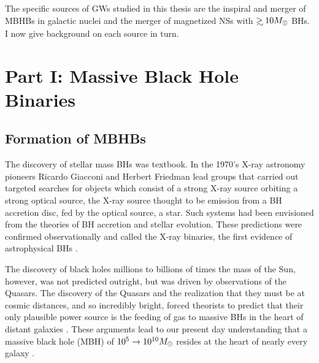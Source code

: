 The specific sources of GWs studied in this thesis are the inspiral and merger
of MBHBs in galactic nuclei and the merger of magnetized NSs with $\gsim 10
\Msun$ BHs. I now give background on each source in turn.






\section{Part I: Massive Black Hole Binaries} 
\subsection{Formation of MBHBs}     

The discovery of stellar mass BHs was textbook. In
the 1970's X-ray astronomy pioneers Ricardo Giacconi and Herbert Friedman lead
groups that carried out targeted searches for objects which consist of a
strong X-ray source orbiting a strong optical source, the X-ray source
thought to be emission from a BH accretion disc, fed by the optical source, a
star. Such systems had been envisioned from the theories of BH accretion and
stellar evolution. These predictions were confirmed observationally and called
the X-ray binaries, the first evidence of astrophysical BHs 
\citep[an entertaining historical account is found in][]{ThorneBHsTimeWarps:CH8}. 


The discovery of black holes millions to billions of times the mass of the
Sun, however, was not predicted outright, but was driven by observations of
the Quasars. The discovery of the Quasars and the realization that they must
be at cosmic distances, and so incredibly bright, forced theorists to predict
that their only plausible power source is the feeding of gas to massive BHs in
the heart of distant galaxies \citep[\textit{e.g.}][]{Schmidt:1963,
Salpeter:1964, LyndenBell:1969}. These arguments lead to our present day
understanding that a massive black hole (MBH) of $10^5 \rightarrow 10^{10}
{M_{\odot}}$ resides at the heart of nearly every galaxy \citep{kr95,
KormendyHo2013, ff05}.



